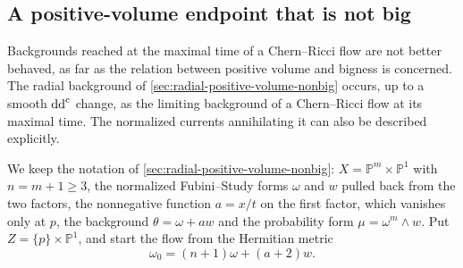 \subsection{A positive-volume endpoint that is not big}
\label{subsec:actual-flow-positive-volume-nonbig}

Backgrounds reached at the maximal time of a Chern--Ricci flow are not better behaved, as far as the relation between positive volume and bigness is concerned. The radial background of \cref{sec:radial-positive-volume-nonbig} occurs, up to a smooth $\mathrm{dd}^{\mathrm{c}}$ change, as the limiting background of a Chern--Ricci flow at its maximal time. The normalized currents annihilating it can also be described explicitly.

We keep the notation of \cref{sec:radial-positive-volume-nonbig}: $X=\mathbb P^m\times\mathbb P^1$ with $n=m+1\geq3$, the normalized Fubini--Study forms $\omega$ and $w$ pulled back from the two factors, the nonnegative function $a=x/t$ on the first factor, which vanishes only at $p$, the background $\theta=\omega+aw$ and the probability form $\mu=\omega^m\wedge w$. Put $Z=\{p\}\times\mathbb P^1$, and start the flow from the Hermitian metric
\begin{equation}\label{eq:radial-flow-initial-metric}
 \omega_0=(n+1)\omega+(a+2)w.
\end{equation}

